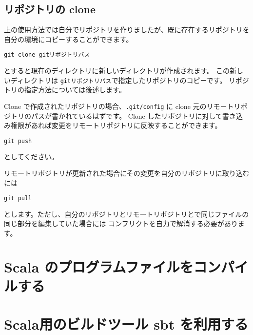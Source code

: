 \documentclass[a4paper,11pt, article]{memoir}
\begin{document}
\subsection{リポジトリの clone}
上の使用方法では自分でリポジトリを作りましたが、既に存在するリポジトリを自分の環境にコピーすることができます。
\begin{verbatim}
git clone gitリポジトリパス
\end{verbatim}
とすると現在のディレクトリに新しいディレクトリが作成されます。
この新しいディレクトリは \texttt{gitリポジトリパス}で指定したリポジトリのコピーです。
リポジトリの指定方法については後述します。

Clone で作成されたリポジトリの場合、\texttt{.git/config} に clone 元のリモートリポジトリのパスが書かれているはずです。
Clone したリポジトリに対して書き込み権限があれば変更をリモートリポジトリに反映することができます。
\begin{verbatim}
git push
\end{verbatim}
としてください。

リモートリポジトリが更新された場合にその変更を自分のリポジトリに取り込むには
\begin{verbatim}
git pull
\end{verbatim}
とします。ただし、自分のリポジトリとリモートリポジトリとで同じファイルの同じ部分を編集していた場合には
コンフリクトを自力で解消する必要があります。
\fi


\section{Scala のプログラムファイルをコンパイルする}

\section{Scala用のビルドツール sbt を利用する}
\fi
\end{document}
